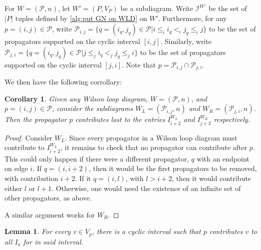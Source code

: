 \documentclass[11pt]{article}
\newcommand{\cP}{\mathcal{P}}
\newcommand{\cI}{\mathcal{I}}
\newtheorem{lem}[thm]{Lemma}
\newtheorem{cor}[thm]{Corollary}
\theoremstyle{remark}
\theoremstyle{definition}
\begin{document}
For $W = (\cP, n)$, let $W' = (P, V_P)$ be a subdiagram. Write $\cI^{W'}$ be the set of $|P|$ tuples defined by \ref{alg:put GN on WLD} on $W'$. Furthermore, for any $p = (i, j) \in \cP$, write $\cP_{i,j} =  \{ q = (i_q, j_q)\in \cP | i \leq_i i_q <_i j_q \leq_i j\}$ to be the set of propagators supported on the cyclic interval $[i, j]$. Similarly, write $\cP_{j,i} =  \{ q = (i_q, j_q)\in \cP | j \leq_j i_q <_j j_q \leq_j i\}$ to be the set of propagators supported on the cyclic interval $[j,i]$. Note that $p = \cP_{i,j} \cap \cP_{j,i}$. 

We then have the following corrollary:


\begin{cor} \label{rightmost prop last cor}
Given any Wilson loop diagram, $W = (\cP, n)$, and $p = (i,j) \in \cP$, consider the subdiagrams $W_L  = (\cP_{i,j}, n)$ and $W_R = (\cP_{j,i}, n)$. Then the propagator $p$ contributes last to the entries $I_{i+2}^{W_L}$ and $I_{j+2}^{W_R}$ respectively.
\end{cor}

\begin{proof}
Consider $W_L$. Since every propagator in a Wilson loop diagram must contribute to $I_{i+2}^{W_L}$, it remains to check that no propagator can contribute after $p$. This could only happen if there were a different propagator, $q$ with an endpoint on edge $i$. If $q = (i , i+2)$, then it would be the first propagators to be removed, with contribution $i+2$. If it $q = (i, l)$, with $l > i+2$, then it would contribute either $l$ or $l+1$. Otherwise, one would need the existence of an infinite set of other propagators, as above.

A similar argument works for $W_R$. 
\end{proof}




\begin{lem} \label{vertex cyclic int lem}
For every $v \in V_p$, there is a cyclic interval such that $p$ contributes $v$ to all $I_{a}$ for in said interval.
\end{lem}
\end{document}

